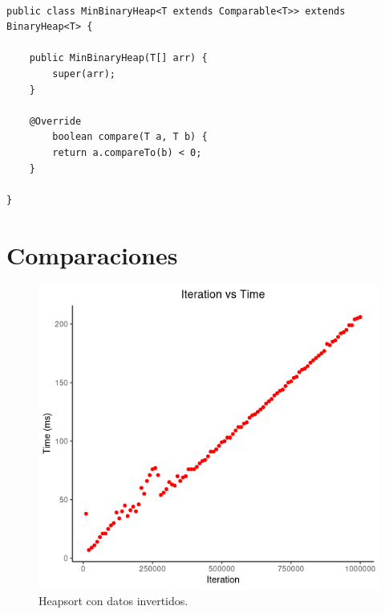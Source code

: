 \documentclass[paper=a4, fontsize=11pt]{scrartcl} %
\numberwithin{equation}{section} %
\numberwithin{figure}{section} %
\numberwithin{table}{section} %
\begin{document}
\begin{lstlisting}

public class MinBinaryHeap<T extends Comparable<T>> extends BinaryHeap<T> {

    public MinBinaryHeap(T[] arr) {
        super(arr);
    }

    @Override
        boolean compare(T a, T b) {
        return a.compareTo(b) < 0;
    }

}

\end{lstlisting}


\section{Comparaciones}\label{sec:comparaciones}

\begin{figure}
    \includegraphics[width=\linewidth]{heap_inverse.png}
    \caption{Heapsort con datos invertidos.}
\end{figure}
\end{document}
